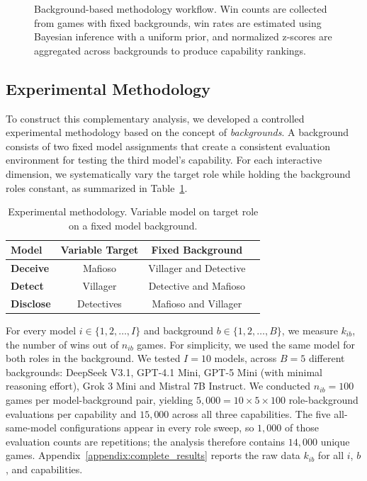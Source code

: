 \documentclass[sigconf,anonymous,balance=false]{aamas}
\begin{document}
\begin{figure}[t!]
    \centering
    \resizebox{\linewidth}{!}{}
    \caption{Background-based methodology workflow. Win counts are collected from games with fixed backgrounds, win rates are estimated using Bayesian inference with a uniform prior, and normalized z-scores are aggregated across backgrounds to produce capability rankings.}
    \label{fig:benchmark_background}
\end{figure}

\subsection{Experimental Methodology}
To construct this complementary analysis, we developed a controlled experimental methodology based on the concept of \textit{backgrounds}. A background consists of two fixed model assignments that create a consistent evaluation environment for testing the third model's capability. For each interactive dimension, we systematically vary the target role while holding the background roles constant, as summarized in Table~\ref{tab:benchmark_methodology}.


\begin{table}[t!]
    \centering
    \caption{Experimental methodology. Variable model on target role on a fixed model background.}
    \begin{tabular}{lccc}
        \toprule
        \textbf{Model} & \textbf{Variable Target} & \textbf{Fixed Background}  \\
        \midrule
        \textbf{Deceive} &  Mafioso & Villager and Detective \\
        \textbf{Detect} & Villager & Detective and Mafioso \\
        \textbf{Disclose} & Detectives & Mafioso and Villager \\
        \bottomrule
    \end{tabular}
    \label{tab:benchmark_methodology}
\end{table}

For every model $i\in\{1,2,\dots,I\}$ and background $b\in\{1,2,\dots, B\}$, we measure $k_{ib}$, the number of wins out of $n_{ib}$ games. For simplicity, we used the same model for both roles in the background. We tested $I=10$ models, across $B=5$ different backgrounds: DeepSeek V3.1, GPT-4.1 Mini, GPT-5 Mini (with minimal reasoning effort), Grok 3 Mini and Mistral 7B Instruct. We conducted $n_{ib}=100$ games per model-background pair, yielding $5{,}000=10\times 5\times 100$ role-background evaluations per capability and $15{,}000$ across all three capabilities. The five all-same-model configurations appear in every role sweep, so $1{,}000$ of those evaluation counts are repetitions; the analysis therefore contains $14{,}000$ unique games. Appendix~\ref{appendix:complete_results} reports the raw data $k_{ib}$ for all $i$, $b$, and capabilities.
\end{document}

